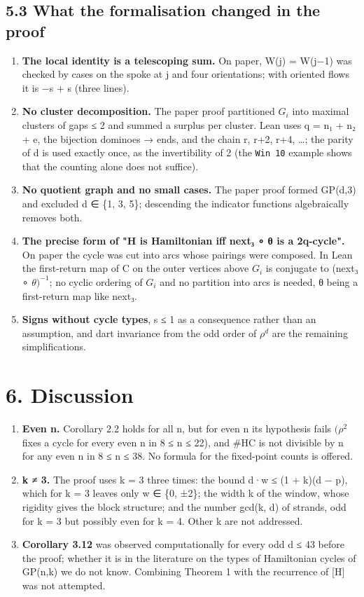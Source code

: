 \documentclass[11pt,a4paper]{article}
\theoremstyle{named}
\begin{document}
\subsection*{5.3 What the formalisation changed in the proof}
\begin{enumerate}
\item[1.] \textbf{The local identity is a telescoping sum.} On paper, W(j) = W(j−1) was checked by cases on the spoke at j and four orientations; with oriented flows it is −s + s (three lines).
\item[2.] \textbf{No cluster decomposition.} The paper proof partitioned $G_i$ into maximal clusters of gaps ≤ 2 and summed a surplus per cluster. Lean uses q = n₁ + n₂ + e, the bijection dominoes → ends, and the chain r, r+2, r+4, …; the parity of d is used exactly once, as the invertibility of 2 (the \texttt{Win\ \allowbreak{}10} example shows that the counting alone does not suffice).
\item[3.] \textbf{No quotient graph and no small cases.} The paper proof formed GP(d,3) and excluded d ∈ \{1, 3, 5\}; descending the indicator functions algebraically removes both.
\item[4.] \textbf{The precise form of "H is Hamiltonian iff next₃ ∘ θ is a 2q-cycle".} On paper the cycle was cut into arcs whose pairings were composed. In Lean the first-return map of C on the outer vertices above $G_i$ is conjugate to (next₃ ∘ $θ)^{−1}$; no cyclic ordering of $G_i$ and no partition into arcs is needed, θ being a first-return map like next₃.
\item[5.] \textbf{Signs without cycle types}, \textbar{}s\textbar{} ≤ 1 as a consequence rather than an assumption, and dart invariance from the odd order of $ρ^d$ are the remaining simplifications.
\end{enumerate}

\section*{6. Discussion}
\begin{enumerate}
\item[1.] \textbf{Even n.} Corollary 2.2 holds for all n, but for even n its hypothesis fails $(ρ^2$ fixes a cycle for every even n in 8 ≤ n ≤ 22), and \#HC is not divisible by n for any even n in 8 ≤ n ≤ 38. No formula for the fixed-point counts is offered.
\item[2.] \textbf{k ≠ 3.} The proof uses k = 3 three times: the bound \textbar{}d·w\textbar{} ≤ (1 + k)(d − p), which for k = 3 leaves only w ∈ \{0, ±2\}; the width k of the window, whose rigidity gives the block structure; and the number gcd(k, d) of strands, odd for k = 3 but possibly even for k = 4. Other k are not addressed.
\item[3.] \textbf{Corollary 3.12} was observed computationally for every odd d ≤ 43 before the proof; whether it is in the literature on the types of Hamiltonian cycles of GP(n,k) we do not know. Combining Theorem 1 with the recurrence of [H] was not attempted.
\end{enumerate}
\end{document}
